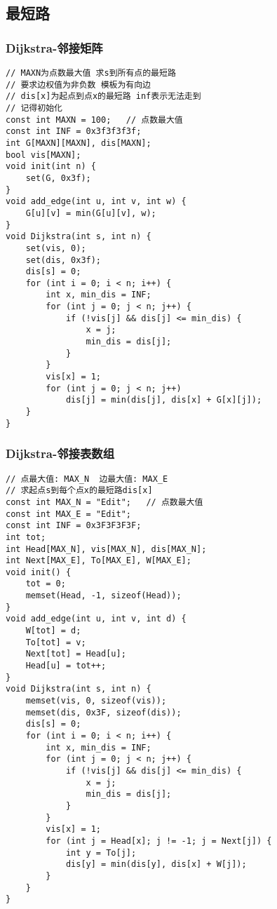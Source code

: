\documentclass[a4paper]{article}
\begin{document}
\subsection{最短路}
\subsubsection{Dijkstra-邻接矩阵}
\begin{lstlisting}
// MAXN为点数最大值 求s到所有点的最短路
// 要求边权值为非负数 模板为有向边
// dis[x]为起点到点x的最短路 inf表示无法走到
// 记得初始化
const int MAXN = 100;	// 点数最大值
const int INF = 0x3f3f3f3f;
int G[MAXN][MAXN], dis[MAXN];
bool vis[MAXN];
void init(int n) {
	set(G, 0x3f);
}
void add_edge(int u, int v, int w) {
	G[u][v] = min(G[u][v], w);
}
void Dijkstra(int s, int n) {
	set(vis, 0);
	set(dis, 0x3f);
	dis[s] = 0;
	for (int i = 0; i < n; i++) {
		int x, min_dis = INF;
		for (int j = 0; j < n; j++) {
			if (!vis[j] && dis[j] <= min_dis) {
				x = j;
				min_dis = dis[j];
			}
		}
		vis[x] = 1;
		for (int j = 0; j < n; j++)
			dis[j] = min(dis[j], dis[x] + G[x][j]);
	}
}
\end{lstlisting}
\subsubsection{Dijkstra-邻接表数组}
\begin{lstlisting}
// 点最大值: MAX_N  边最大值: MAX_E
// 求起点s到每个点x的最短路dis[x]
const int MAX_N = "Edit";	// 点数最大值
const int MAX_E = "Edit"; 
const int INF = 0x3F3F3F3F;
int tot;
int Head[MAX_N], vis[MAX_N], dis[MAX_N];
int Next[MAX_E], To[MAX_E], W[MAX_E];
void init() {
	tot = 0;
	memset(Head, -1, sizeof(Head));
}
void add_edge(int u, int v, int d) {
	W[tot] = d;
	To[tot] = v;
	Next[tot] = Head[u];
	Head[u] = tot++;
}
void Dijkstra(int s, int n) {
	memset(vis, 0, sizeof(vis));
	memset(dis, 0x3F, sizeof(dis));
	dis[s] = 0;
	for (int i = 0; i < n; i++) {
		int x, min_dis = INF;
		for (int j = 0; j < n; j++) {
			if (!vis[j] && dis[j] <= min_dis) {
				x = j;
				min_dis = dis[j];
			}
		}
		vis[x] = 1;
		for (int j = Head[x]; j != -1; j = Next[j]) {
			int y = To[j];
			dis[y] = min(dis[y], dis[x] + W[j]);
		}
	}
}
\end{lstlisting}
\end{document}

